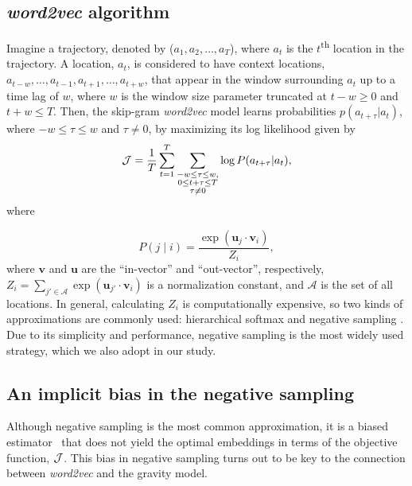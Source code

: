 \documentclass[12pt,draft,a4paper]{article}
\newcommand{\vect}[1]{\boldsymbol{#1}}
\def\given{\mid}
\begin{document}
\subsection{\textit{word2vec} algorithm}
Imagine a trajectory, denoted by ($a_{1}, a_{2}, \ldots, a_{T}$), where $a_{t}$ is the $t$\textsuperscript{th} location in the trajectory. A location, $a_{t}$, is considered to have context locations, $a_{t-w}, \ldots, a_{t-1}, a_{t+1},\ldots, a_{t+w}$, that appear in the window surrounding $a_t$ up to a time lag of $w$, where $w$ is the window size parameter truncated at $t - w \geq 0$ and $t + w \leq T$.
Then, the skip-gram \textit{word2vec} model learns probabilities $p(a_{t + \tau} \vert a_{t})$, where $-w\leq \tau\leq w$ and $\tau \neq 0$,  by maximizing its log likelihood given by
%
%
\begin{equation}
	{\cal J} = \frac{1}{T}\sum_{t = 1}^{T} \sum_{ \substack{-w \leq \tau \leq w, \\ 0 \leq t+\tau \leq T \\\tau \neq 0}} \log P(a_{t + \tau} \vert a_{t}), \label{eq:word2vec-obj}
\end{equation}
where

%
%
\begin{equation}
	P(j \given i) = \frac{\exp(\vect{u}_j \cdot \vect{v}_{i})}{Z_i}, \label{eq:cond_prob_w2v}
\end{equation}
where $\vect{v}$ and $\vect{u}$ are the ``in-vector'' and ``out-vector'', respectively,  $Z_i=\sum_{j' \in \mathcal{A}} \exp(\vect{u}_{j'} \cdot \vect{v}_{i})$ is a normalization constant, and $\mathcal{A}$ is the set of all locations. In general, calculating $Z_i$ is computationally expensive, so two kinds of approximations are commonly used:
hierarchical softmax \autocite{morin2005hierarchical} and negative sampling \autocite{mikolov2013word2vec}.
Due to its simplicity and performance, negative sampling is the most widely used strategy, which we also adopt in our study.


\subsection{An implicit bias in the negative sampling}

Although negative sampling is the most common approximation, it is a biased estimator~\autocite{Chia2010,Dyer2014} that does not yield the optimal embeddings in terms of the objective function, ${\cal J}$.
This bias in negative sampling turns out to be key to the connection between {\it word2vec} and the gravity model.
\end{document}
